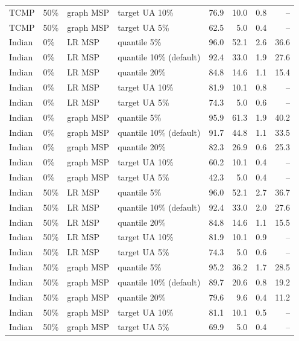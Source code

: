 \begin{table}[!htbp]
{\begin{tabular}{llllrrrr}
TCMP & 50\% & graph MSP & target UA 10\% & 76.9 & 10.0 & 0.8 & --\\
TCMP & 50\% & graph MSP & target UA 5\% & 62.5 & 5.0 & 0.4 & --\\
\midrule
Indian & 0\% & LR MSP & quantile 5\% & 96.0 & 52.1 & 2.6 & 36.6\\
Indian & 0\% & LR MSP & quantile 10\% (default) & 92.4 & 33.0 & 1.9 & 27.6\\
Indian & 0\% & LR MSP & quantile 20\% & 84.8 & 14.6 & 1.1 & 15.4\\
Indian & 0\% & LR MSP & target UA 10\% & 81.9 & 10.1 & 0.8 & --\\
Indian & 0\% & LR MSP & target UA 5\% & 74.3 & 5.0 & 0.6 & --\\
Indian & 0\% & graph MSP & quantile 5\% & 95.9 & 61.3 & 1.9 & 40.2\\
Indian & 0\% & graph MSP & quantile 10\% (default) & 91.7 & 44.8 & 1.1 & 33.5\\
Indian & 0\% & graph MSP & quantile 20\% & 82.3 & 26.9 & 0.6 & 25.3\\
Indian & 0\% & graph MSP & target UA 10\% & 60.2 & 10.1 & 0.4 & --\\
Indian & 0\% & graph MSP & target UA 5\% & 42.3 & 5.0 & 0.4 & --\\
\midrule
Indian & 50\% & LR MSP & quantile 5\% & 96.0 & 52.1 & 2.7 & 36.7\\
Indian & 50\% & LR MSP & quantile 10\% (default) & 92.4 & 33.0 & 2.0 & 27.6\\
Indian & 50\% & LR MSP & quantile 20\% & 84.8 & 14.6 & 1.1 & 15.5\\
Indian & 50\% & LR MSP & target UA 10\% & 81.9 & 10.1 & 0.9 & --\\
Indian & 50\% & LR MSP & target UA 5\% & 74.3 & 5.0 & 0.6 & --\\
Indian & 50\% & graph MSP & quantile 5\% & 95.2 & 36.2 & 1.7 & 28.5\\
Indian & 50\% & graph MSP & quantile 10\% (default) & 89.7 & 20.6 & 0.8 & 19.2\\
Indian & 50\% & graph MSP & quantile 20\% & 79.6 & 9.6 & 0.4 & 11.2\\
Indian & 50\% & graph MSP & target UA 10\% & 81.1 & 10.1 & 0.5 & --\\
Indian & 50\% & graph MSP & target UA 5\% & 69.9 & 5.0 & 0.4 & --\\
\bottomrule\end{tabular}}
\ifdim\wd\tablebox>\linewidth\resizebox{\linewidth}{!}{\usebox{\tablebox}}\else\usebox{\tablebox}\fi
\end{table}

